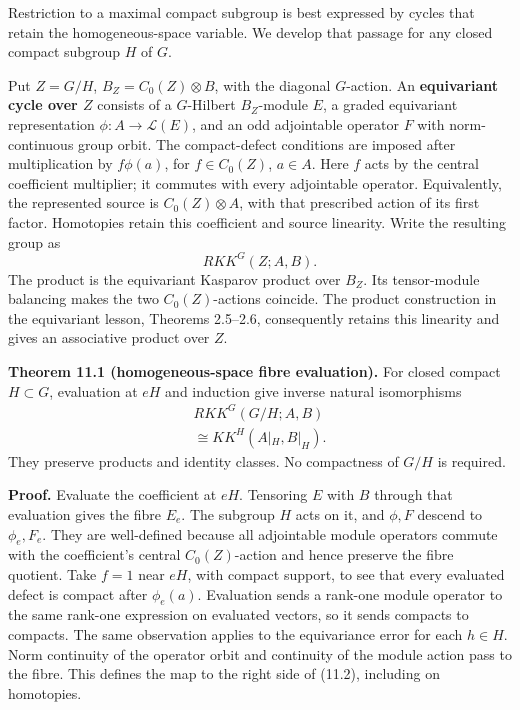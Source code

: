 \documentclass[
  11pt,
]{article}
\begin{document}
Restriction to a maximal compact subgroup is best expressed by cycles
that retain the homogeneous-space variable. We develop that passage for
any closed compact subgroup \(H\) of \(G\).

Put \(Z=G/H\), \(B_Z=C_0(Z)\otimes B\), with the diagonal \(G\)-action.
An \textbf{equivariant cycle over \(Z\)} consists of a \(G\)-Hilbert
\(B_Z\)-module \(E\), a graded equivariant representation
\(\phi:A\to\mathcal L(E)\), and an odd adjointable operator \(F\) with
norm-continuous group orbit. The compact-defect conditions are imposed
after multiplication by \(f\phi(a)\), for \(f\in C_0(Z)\), \(a\in A\).
Here \(f\) acts by the central coefficient multiplier; it commutes with
every adjointable operator. Equivalently, the represented source is
\(C_0(Z)\otimes A\), with that prescribed action of its first factor.
Homotopies retain this coefficient and source linearity. Write the
resulting group as \[
RKK^G(Z;A,B).
\tag{11.1}
\] The product is the equivariant Kasparov product over \(B_Z\). Its
tensor-module balancing makes the two \(C_0(Z)\)-actions coincide. The
product construction in the equivariant lesson, Theorems 2.5--2.6,
consequently retains this linearity and gives an associative product
over \(Z\).

\textbf{Theorem 11.1 (homogeneous-space fibre evaluation).} For closed
compact \(H\subset G\), evaluation at \(eH\) and induction give inverse
natural isomorphisms \[
\begin{gathered}
RKK^G(G/H;A,B)\\
\cong KK^H(A|_H,B|_H).
\end{gathered}
\tag{11.2}
\] They preserve products and identity classes. No compactness of
\(G/H\) is required.

\textbf{Proof.} Evaluate the coefficient at \(eH\). Tensoring \(E\) with
\(B\) through that evaluation gives the fibre \(E_e\). The subgroup
\(H\) acts on it, and \(\phi,F\) descend to \(\phi_e,F_e\). They are
well-defined because all adjointable module operators commute with the
coefficient's central \(C_0(Z)\)-action and hence preserve the fibre
quotient. Take \(f=1\) near \(eH\), with compact support, to see that
every evaluated defect is compact after \(\phi_e(a)\). Evaluation sends
a rank-one module operator to the same rank-one expression on evaluated
vectors, so it sends compacts to compacts. The same observation applies
to the equivariance error for each \(h\in H\). Norm continuity of the
operator orbit and continuity of the module action pass to the fibre.
This defines the map to the right side of (11.2), including on
homotopies.
\end{document}
